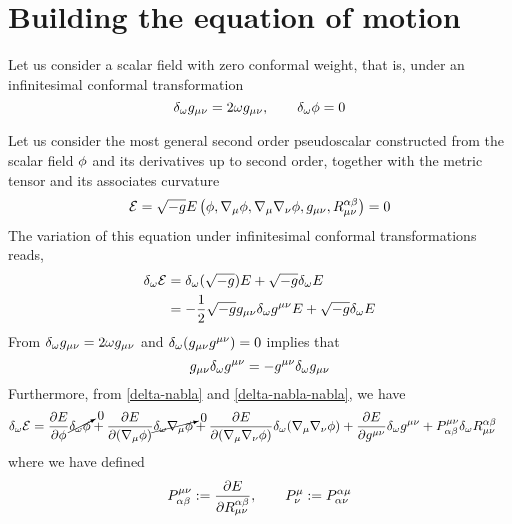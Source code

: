 \section{Building the equation of motion}
Let us consider a scalar field with zero conformal weight, that is, under an infinitesimal conformal transformation
\begin{equation}
  \delta_\omega g_{\mu\nu }=2\omega g_{\mu\nu },\qquad \delta_\omega\phi=0
\end{equation}

Let us consider the most general second order pseudoscalar constructed from the scalar field $\phi$ and its derivatives up to second order, together with the metric tensor and its associates curvature
\begin{equation}
	\mathcal{E} =\sqrt{-g}E\left(\phi,\nabla_\mu \phi ,\nabla_\mu \nabla_\nu \phi ,g_{\mu\nu },R_{\mu\nu }^{\alpha\beta }\right)=0
\end{equation}
The variation of this equation under infinitesimal conformal transformations reads,
\begin{align}
  \delta_\omega \mathcal{E}&=\delta_\omega(\sqrt{-g})E+\sqrt{-g}\delta_\omega E\\
  &=-\frac{1}{2}\sqrt{-g}g_{\mu\nu }\delta_\omega g^{\mu\nu }E+\sqrt{-g}\delta_\omega E
\end{align}
From $\delta_\omega g_{\mu\nu }=2\omega g_{\mu\nu }$ and $\delta_\omega(g_{\mu\nu }g^{\mu\nu })=0$ implies that
\begin{equation}
  g_{\mu\nu }\delta_\omega g^{\mu\nu }=-g^{\mu\nu }\delta_\omega g_{\mu\nu }
\end{equation}
Furthermore, from \eqref{delta-nabla} and \eqref{delta-nabla-nabla}, we have
\begin{align}
  \delta_\omega \mathcal{E}&=\pdv{E}{\phi}\cancelto{0}{\delta_\omega \phi} +\pdv{E}{(\nabla_\mu\phi)}\cancelto{0}{\delta_\omega \nabla_\mu \phi} +\pdv{E}{(\nabla_\mu\nabla_\nu\phi)}\delta_\omega (\nabla_\mu \nabla_\nu \phi )+\pdv{E}{g^{\mu\nu}}\delta_\omega g^{\mu\nu }+P^{\mu\nu }_{\alpha\beta }\delta_\omega R^{\alpha\beta }_{\mu\nu }
\end{align}
where we have defined 
\begin{equation}\label{P-trnsor}
  P^{\mu\nu }_{\alpha\beta }:=\pdv{E}{R_{\mu\nu}^{\alpha\beta}},\qquad   P^\mu_\nu :=P^{\alpha\mu }_{\alpha\nu }
\end{equation}

